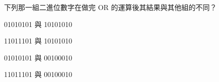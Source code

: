 \ifx\ntpcNinetyThree\undefined[93學年基北區] \fi
下列那一組二進位數字在做完 OR 的運算後其結果與其他組的不同？
  \begin{optionlist}
  \item 01010101 與 10101010 
  \item 11011101 與 10101010
  \item 01010101 與 00100010\label{ntpc-93-a16}
  \item 11011101 與 00100010
  \end{optionlist}